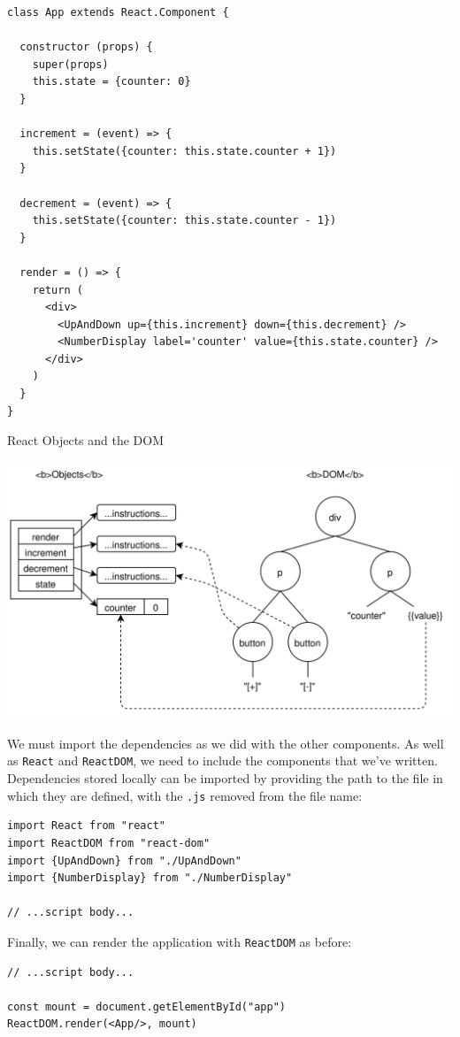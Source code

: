 \begin{verbatim}
class App extends React.Component {

  constructor (props) {
    super(props)
    this.state = {counter: 0}
  }

  increment = (event) => {
    this.setState({counter: this.state.counter + 1})
  }

  decrement = (event) => {
    this.setState({counter: this.state.counter - 1})
  }

  render = () => {
    return (
      <div>
        <UpAndDown up={this.increment} down={this.decrement} />
        <NumberDisplay label='counter' value={this.state.counter} />
      </div>
    )
  }
}
\end{verbatim}

React Objects and the DOM

\includegraphics{../../files/interactive-objects-dom.svg}

We must import the dependencies as we did with the other components. As
well as \texttt{React} and \texttt{ReactDOM}, we need to include the
components that we've written. Dependencies stored locally can be
imported by providing the path to the file in which they are defined,
with the \texttt{.js} removed from the file name:

\begin{verbatim}
import React from "react"
import ReactDOM from "react-dom"
import {UpAndDown} from "./UpAndDown"
import {NumberDisplay} from "./NumberDisplay"

// ...script body...
\end{verbatim}

Finally, we can render the application with \texttt{ReactDOM} as before:

\begin{verbatim}
// ...script body...

const mount = document.getElementById("app")
ReactDOM.render(<App/>, mount)
\end{verbatim}


